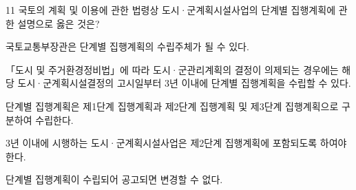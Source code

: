 \begin{question}{11}
국토의 계획 및 이용에 관한 법령상 도시·군계획시설사업의 단계별 집행계획에 관한 설명으로 옳은 것은?
\begin{choices}
  \item 국토교통부장관은 단계별 집행계획의 수립주체가 될 수 있다.
  \item 「도시 및 주거환경정비법」에 따라 도시·군관리계획의 결정이 의제되는 경우에는 해당 도시·군계획시설결정의 고시일부터 3년 이내에 단계별 집행계획을 수립할 수 있다.
  \item 단계별 집행계획은 제1단계 집행계획과 제2단계 집행계획 및 제3단계 집행계획으로 구분하여 수립한다.
  \item 3년 이내에 시행하는 도시·군계획시설사업은 제2단계 집행계획에 포함되도록 하여야 한다.
  \item 단계별 집행계획이 수립되어 공고되면 변경할 수 없다.
\end{choices}
\end{question}
